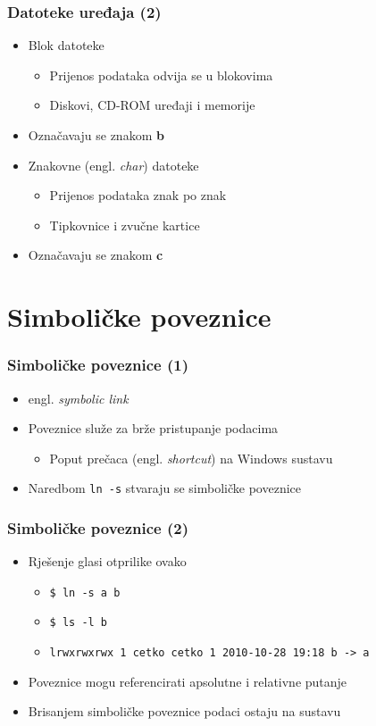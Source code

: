 \documentclass{beamer}
\newcommand{\shell}[1]{\texttt{\small #1}}
\begin{document}
\begin{frame}[t]
\frametitle{Datoteke uređaja (2)}
\begin{itemize}
  \item Blok datoteke
  \begin{itemize}
    \item Prijenos podataka odvija se u blokovima
    \item Diskovi, CD-ROM uređaji i memorije
  \end{itemize}
  \item Označavaju se znakom \textbf{b}
  \item Znakovne (engl. \emph{char}) datoteke
  \begin{itemize}
    \item Prijenos podataka znak po znak
    \item Tipkovnice i zvučne kartice
  \end{itemize}
  \item Označavaju se znakom \textbf{c}
\end{itemize}
\end{frame}

\section{Simboličke poveznice}
\begin{frame}[t]
\frametitle{Simboličke poveznice (1)}
\begin{itemize}
  \item engl. \emph{symbolic link}
  \item Poveznice služe za brže pristupanje podacima
  \begin{itemize}
    \item Poput prečaca (engl. \emph{shortcut}) na Windows sustavu
  \end{itemize}
  \item Naredbom \shell{ln -s} stvaraju se simboličke poveznice
\end{itemize}
\end{frame}

\begin{frame}[t]
\frametitle{Simboličke poveznice (2)}
\begin{itemize}
  \item Rješenje glasi otprilike ovako
  \begin{itemize}
    \item[] \shell{\$ ln -s a b}
    \item[] \shell{\$ ls -l b}
    \item[] \shell{\footnotesize lrwxrwxrwx 1 cetko cetko 1 2010-10-28 19:18 b -> a}
  \end{itemize}
  \item Poveznice mogu referencirati apsolutne i relativne putanje
  \item Brisanjem simboličke poveznice podaci ostaju na sustavu
\end{itemize}
\end{frame}
\end{document}
